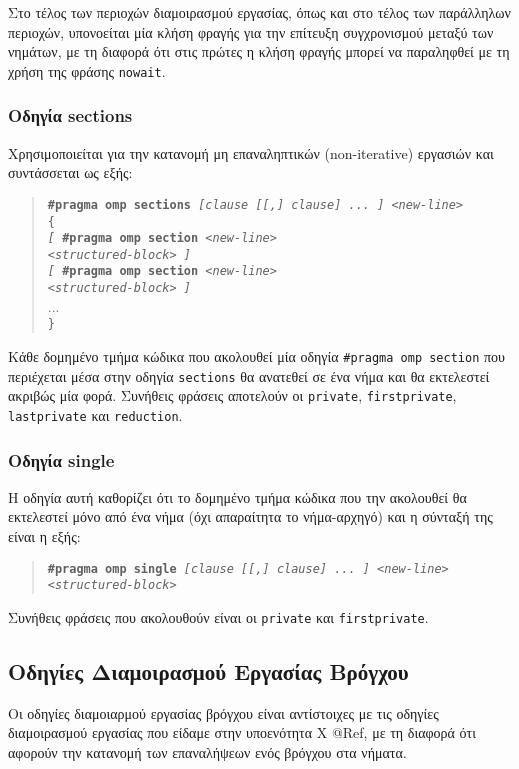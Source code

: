Στο τέλος των περιοχών διαμοιρασμού εργασίας, όπως και στο τέλος των παράλληλων περιοχών, υπονοείται μία κλήση φραγής για την επίτευξη συγχρονισμού μεταξύ των νημάτων, με τη διαφορά ότι στις πρώτες η κλήση φραγής μπορεί να παραληφθεί με τη χρήση της φράσης \texttt{nowait}.

\subsubsection{Οδηγία sections}
Χρησιμοποιείται για την κατανομή μη επαναληπτικών (non-iterative) εργασιών και συντάσσεται ως εξής:
\begin{quote}
	\texttt{\textbf{\#pragma omp sections} \textit{[clause [[,] clause] ... ] <new-line>}} \\
	\texttt{\{} \\
		\texttt{\textit{[} \textbf{\#pragma omp section} \textit{<new-line>}} \\
		\texttt{\textit{<structured-block> ]}} \\
		\texttt{\textit{[} \textbf{\#pragma omp section} \textit{<new-line>}} \\
		\texttt{\textit{<structured-block> ]}} \\
		... \\
	\texttt{\}}
\end{quote}

Κάθε δομημένο τμήμα κώδικα που ακολουθεί μία οδηγία \texttt{\#pragma omp section} που περιέχεται μέσα στην οδηγία \texttt{sections} θα ανατεθεί σε ένα νήμα και θα εκτελεστεί ακριβώς μία φορά. Συνήθεις φράσεις αποτελούν οι \texttt{private}, \texttt{firstprivate}, \texttt{lastprivate} και \texttt{reduction}.

\subsubsection{Οδηγία single}
Η οδηγία αυτή καθορίζει ότι το δομημένο τμήμα κώδικα που την ακολουθεί θα εκτελεστεί μόνο από ένα νήμα (όχι απαραίτητα το νήμα-αρχηγό) και η σύνταξή της είναι η εξής:
\begin{quote}
	\texttt{\textbf{\#pragma omp single} \textit{[clause [[,] clause] ... ] <new-line>}} \\
		\texttt{\textit{<structured-block>}}
\end{quote}

Συνήθεις φράσεις που ακολουθούν είναι οι \texttt{private} και \texttt{firstprivate}.


\subsection{Οδηγίες Διαμοιρασμού Εργασίας Βρόγχου}
Οι οδηγίες διαμοιαρμού εργασίας βρόγχου είναι αντίστοιχες με τις οδηγίες διαμοιρασμού εργασίας που είδαμε στην υποενότητα Χ @Ref, με τη διαφορά ότι αφορούν την κατανομή των επαναλήψεων ενός βρόγχου στα νήματα.

